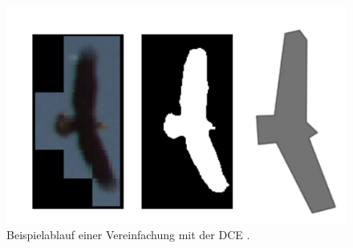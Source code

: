 \begin{figure}[ht]
	\vspace{-0.5cm}
	   \centering
	   \includegraphics*[scale = 0.5, keepaspectratio, trim=2 2 2 2 ]{images/Example_bird.png}
	   \caption[Beispielablauf der Segmentierung und DCE]{Beispielablauf einer Vereinfachung mit der DCE \citep{Dorr2017}.}
	   \label{Bsp_Dorr}
\end{figure}


